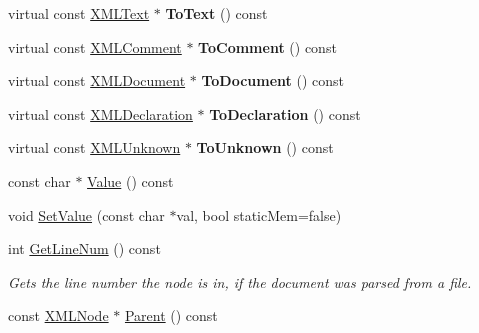 \begin{DoxyCompactItemize}
\item 
virtual const \hyperlink{classtinyxml2_1_1XMLText}{X\+M\+L\+Text} $\ast$ {\bfseries To\+Text} () const \hypertarget{classtinyxml2_1_1XMLNode_a89009ffc1b9f5d692bf8d4c9f18c3bec}{}\label{classtinyxml2_1_1XMLNode_a89009ffc1b9f5d692bf8d4c9f18c3bec}

\item 
virtual const \hyperlink{classtinyxml2_1_1XMLComment}{X\+M\+L\+Comment} $\ast$ {\bfseries To\+Comment} () const \hypertarget{classtinyxml2_1_1XMLNode_a157ce3a00ea5ee5a85b7103138e85e8a}{}\label{classtinyxml2_1_1XMLNode_a157ce3a00ea5ee5a85b7103138e85e8a}

\item 
virtual const \hyperlink{classtinyxml2_1_1XMLDocument}{X\+M\+L\+Document} $\ast$ {\bfseries To\+Document} () const \hypertarget{classtinyxml2_1_1XMLNode_a3ff975733a17d6ced3539b45544c8bf6}{}\label{classtinyxml2_1_1XMLNode_a3ff975733a17d6ced3539b45544c8bf6}

\item 
virtual const \hyperlink{classtinyxml2_1_1XMLDeclaration}{X\+M\+L\+Declaration} $\ast$ {\bfseries To\+Declaration} () const \hypertarget{classtinyxml2_1_1XMLNode_aedae0bbb58d533a4b8a61042388b49e5}{}\label{classtinyxml2_1_1XMLNode_aedae0bbb58d533a4b8a61042388b49e5}

\item 
virtual const \hyperlink{classtinyxml2_1_1XMLUnknown}{X\+M\+L\+Unknown} $\ast$ {\bfseries To\+Unknown} () const \hypertarget{classtinyxml2_1_1XMLNode_a71f5ae90296dbe67979f83fe97073efa}{}\label{classtinyxml2_1_1XMLNode_a71f5ae90296dbe67979f83fe97073efa}

\item 
const char $\ast$ \hyperlink{classtinyxml2_1_1XMLNode_a92835c779871918f9af569bfe9669fe6}{Value} () const 
\item 
void \hyperlink{classtinyxml2_1_1XMLNode_a09dd68cf9eae137579f6e50f36487513}{Set\+Value} (const char $\ast$val, bool static\+Mem=false)
\item 
int \hyperlink{classtinyxml2_1_1XMLNode_a8d4cfe85e7016625bcf6c835b85974d4}{Get\+Line\+Num} () const \hypertarget{classtinyxml2_1_1XMLNode_a8d4cfe85e7016625bcf6c835b85974d4}{}\label{classtinyxml2_1_1XMLNode_a8d4cfe85e7016625bcf6c835b85974d4}

\begin{DoxyCompactList}\small\item\em Gets the line number the node is in, if the document was parsed from a file. \end{DoxyCompactList}\item 
const \hyperlink{classtinyxml2_1_1XMLNode}{X\+M\+L\+Node} $\ast$ \hyperlink{classtinyxml2_1_1XMLNode_a4e39bdcf9bfafa55d04857ece6aaf64e}{Parent} () const \hypertarget{classtinyxml2_1_1XMLNode_a4e39bdcf9bfafa55d04857ece6aaf64e}{}\label{classtinyxml2_1_1XMLNode_a4e39bdcf9bfafa55d04857ece6aaf64e}


\end{DoxyCompactItemize}
